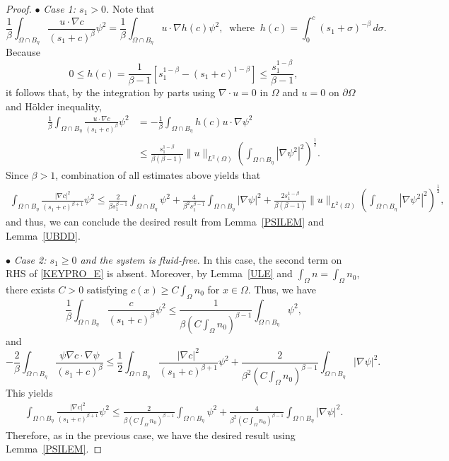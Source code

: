 \documentclass{amsart}
\numberwithin{equation}{section}
\newcommand{\bke}[1]{\left( #1 \right)}
\begin{document}
\begin{proof}
	
$\bullet$ \emph{Case 1: $s_1 >0$.}  Note that 
	\[
	\frac{1}{\beta}\int_{\Omega \cap B_{\eta}}\frac{u \cdot \nabla c}{(s_{1}+c)^{\beta  }} \psi^2 = \frac{1}{\beta}\int_{\Omega \cap B_{\eta}} u\cdot \nabla h(c) \psi^2, 
	\ \text{ where } \ h(c)=\int_{0}^{c} (s_{1}+\sigma)^{-\beta} \,d\sigma.
	\]
Because 
 	\[
	0 \le h(c) = \frac{1}{\beta -1} \left[s_{1}^{1-\beta}-(s_{1}+c)^{1-\beta}\right] \leq \frac{s_{1}^{1-\beta}}{\beta - 1},
	\]
it follows that, by the integration by parts using $\nabla\cdot u=0$ in $\Omega$ and $u=0$ on $\partial\Omega$ and H\"{o}lder inequality,
	\[\begin{aligned}
	\frac{1}{\beta}\int_{\Omega \cap B_{\eta}}\frac{u \cdot \nabla c}{(s_{1}+c)^{\beta  }} \psi^2 
	& = -\frac{1}{\beta}\int_{\Omega \cap B_{\eta}} h(c)   u \cdot \nabla \psi^{2} \\
	&\leq \frac{s_{1}^{1-\beta}}{\beta (\beta - 1)} \|u\|_{L^{2}(\Omega)}\bke{\int_{\Omega \cap B_{\eta}}    |\nabla \psi^{2}|^{2}}^{\frac{1}{2}}.
	\end{aligned}
	\]
Since $\beta >1$, combination of all estimates above yields that 
\[\begin{aligned}
	\int_{\Omega \cap B_{\eta}} \frac{|\nabla c|^2}{(s_{1}+c)^{\beta+1}} \psi^2 
     \leq \frac{2}{\beta s_{1}^{\beta-1}}\int_{\Omega \cap B_{\eta}}   \psi^2 + \frac{4}{\beta^2s_{1}^{\beta-1}}\int_{\Omega \cap B_{\eta}}  |\nabla \psi|^2 + \frac{2 s_{1}^{1-\beta}}{\beta (\beta - 1)} \|u\|_{L^{2}(\Omega)}\left(\int_{\Omega \cap B_{\eta}}|\nabla \psi^2|^2\right)^{\frac{1}{2}},
\end{aligned}
\]
and thus, we can conclude the desired result from Lemma~\ref{PSILEM} and Lemma~\ref{UBDD}.
\smallskip 

$\bullet$ \emph{Case 2: $s_{1}\ge0$ and the system is fluid-free.}  In this case, the second term on RHS of \eqref{KEYPRO_E} is absent. Moreover, by Lemma~\ref{ULE} and $\int_{\Omega}n=\int_{\Omega}n_{0}$, there exists $C>0$ satisfying  $c(x) \ge C\int_{\Omega}n_{0}$ for $x\in \Omega$. Thus, we have
	\[
	\frac{1}{\beta}\int_{\Omega \cap B_{\eta}}\frac{c}{(s_{1}+c)^{\beta}} \psi^2 \le \frac{1}{\beta (C\int_{\Omega}n_{0})^{\beta-1}}\int_{\Omega \cap B_{\eta}}  \psi^2,
	\]
	and 
	\[
	 - \frac{2}{\beta}\int_{\Omega \cap B_{\eta}} \frac{\psi \nabla c \cdot \nabla \psi}{(s_{1}+c)^{\beta}} \leq \frac{1}{2}\int_{\Omega \cap B_{\eta}}\frac{|\nabla c|^2}{(s_{1}+c)^{\beta+1}} \psi^2 + \frac{2}{\beta^2(C\int_{\Omega}n_{0})^{\beta-1}}\int_{\Omega \cap B_{\eta}}|\nabla \psi|^2.
	\]
This yields 
\[\begin{aligned}
	\int_{\Omega \cap B_{\eta}} \frac{|\nabla c|^2}{(s_{1}+c)^{\beta+1}} \psi^2 
    \leq \frac{2}{\beta (C\int_{\Omega}n_{0})^{\beta-1}}\int_{\Omega \cap B_{\eta}}   \psi^2 + \frac{4}{\beta^2(C\int_{\Omega}n_{0})^{\beta-1}}\int_{\Omega \cap B_{\eta}}  |\nabla \psi|^2.
     \end{aligned}
\]
Therefore, as in the previous case, we have the desired result using Lemma~\ref{PSILEM}. 
\end{proof}
\end{document}
